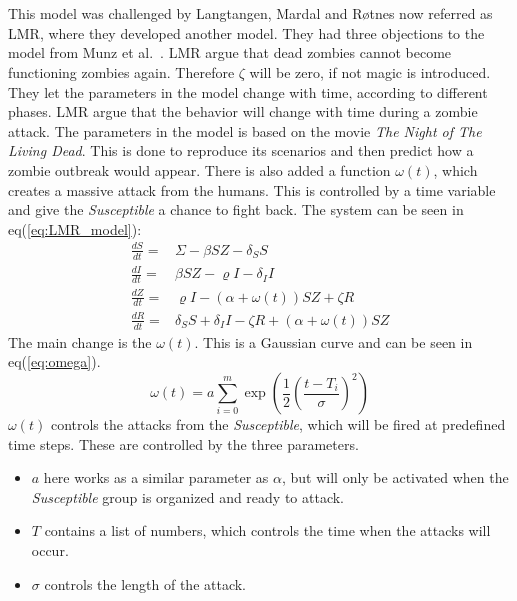 \documentclass[%
twoside,                 %
final,                   %
10pt]{article}
\begin{document}
\noindent
\\
\\
This model was challenged by Langtangen, Mardal and Røtnes \cite{zombie-math} now referred as LMR, where they developed another model. They had three objections to the model from Munz et al.~\cite{munz2009zombies}. LMR argue that dead zombies cannot become functioning zombies again. Therefore $\zeta$ will be zero, if not magic is introduced. They let the parameters in the model change with time, according to different phases. LMR argue that the behavior will change with time during a zombie attack. The parameters in the model is based on the movie \emph{The Night of The Living Dead}. This is done to reproduce its scenarios and then predict how a zombie outbreak would appear. There is also added a function $\omega(t)$, which creates a massive attack from the humans. This is controlled by a time variable and give the \emph{Susceptible} a chance to fight back. The system can be seen in eq(\ref{eq:LMR_model}):
\begin{equation} \label{eq:LMR_model}
	\begin{aligned} 
	\frac{dS}{dt} =& \Sigma -\beta SZ - \delta_SS \\
	\frac{dI}{dt} =& \beta SZ - \varrho I - \delta_II\\
	\frac{dZ}{dt} =& \varrho I- (\alpha+\omega(t))SZ + \zeta R\\
	\frac{dR}{dt} =& \delta_SS +\delta_II -\zeta R + (\alpha+\omega(t))SZ 
	\end{aligned}
\end{equation}
The main change is the $\omega(t)$. This is a Gaussian curve and can be seen in eq(\ref{eq:omega}).
\begin{equation} \label{eq:omega}
\omega(t) = a \sum^m_{i=0}\exp\left(\frac{1}{2}\left(\frac{t-T_i}{\sigma}\right)^2\right)
\end{equation}
$\omega(t)$ controls the attacks from the \emph{Susceptible}, which will be fired at predefined time steps. These are controlled by the three parameters. 
\begin{itemize}
\item $a$ here works as a similar parameter as $\alpha$, but will only be activated when the \emph{Susceptible} group is organized and ready to attack. 

\item $T$ contains a list of numbers, which controls the time when the attacks will occur.

\item $\sigma$ controls the length of the attack. 
\end{itemize}
\end{document}
